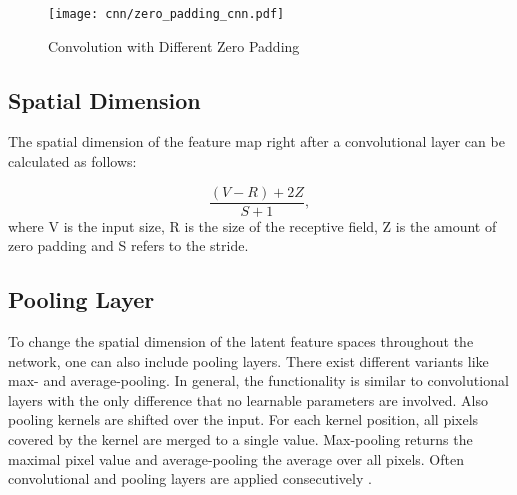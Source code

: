 \begin{figure}[H]
  \centering
  \texttt{[image: cnn/zero\_padding\_cnn.pdf]}
  \caption {Convolution with Different Zero Padding}
  \label{fig:zero_padding_cnn}
\end{figure}



\subsection{Spatial Dimension}

 The spatial dimension of the feature map right after a convolutional layer can be calculated as follows:

\begin{equation}
  \frac{(V-R)+2Z}{S+1}, 
  \label{eq:spatial_dimensionality_cnn_feature map}
\end{equation}
where V is the input size, R is the size of the receptive field, Z is the amount of zero padding and S refers to the stride.

\subsection{Pooling Layer}
To change the spatial dimension of the latent feature spaces throughout the network, one can also include pooling layers. There exist different variants like max- and average-pooling. In general, the functionality is similar to convolutional layers with the only difference that no learnable parameters are involved. Also pooling kernels are shifted over the input. For each kernel position, all pixels covered by the kernel are merged to a single value. Max-pooling returns the maximal pixel value and average-pooling the average over all pixels. Often convolutional and pooling layers are applied consecutively \cite{OShea2015}.

